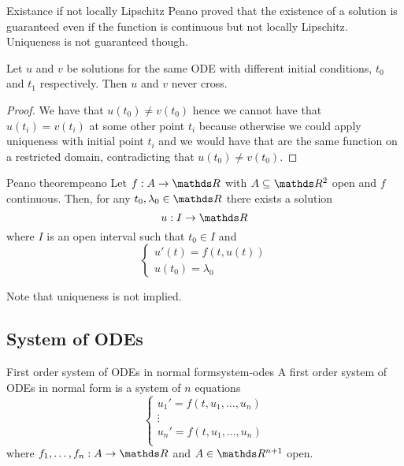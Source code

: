 \documentclass[12pt]{extarticle}
\begin{document}
\begin{remark}{Existance if not locally Lipschitz}{}
    Peano proved that the existence of a solution is guaranteed even if the function is continuous but not locally Lipschitz.
    Uniqueness is not guaranteed though.
\end{remark}

\begin{corollary}{}{}
    Let $u$ and $v$ be solutions for the same ODE with different initial conditions, $t_0$ and $t_1$ respectively.
    Then $u$ and $v$ never cross.
\end{corollary}

\begin{proof}
    We have that $u(t_0) \neq v(t_0)$ hence we cannot have that $u(t_i) = v(t_i)$ at some other point $t_i$ because otherwise we could apply uniqueness with initial point $t_i$ and we would have that are the same function on a restricted domain,
    contradicting that $u(t_0) \neq v(t_0)$.
\end{proof}

\begin{theorem}{Peano theorem}{peano}
    Let $f: A \to \R$ with $A \subseteq \R^2$ open and $f$ continuous.
    Then, for any $t_0, \lambda_0 \in \R$ there exists a solution
    \begin{equation}
        u: I \to \R
    \end{equation}
    where $I$ is an open interval such that $t_0 \in I$ and
    \begin{equation}
        \begin{cases}
            u'(t) = f(t, u(t)) \\
            u(t_0) = \lambda_0
        \end{cases}
    \end{equation}

    Note that uniqueness is not implied.
\end{theorem}

\subsection{System of ODEs}

\begin{definition}{First order system of ODEs in normal form}{system-odes}
    A first order system of ODEs in normal form is a system of $n$ equations
    \begin{equation}
        \begin{cases}
            u_1' = f(t, u_1, \dots, u_n) \\
            \vdots                       \\
            u_n' = f(t, u_1, \dots, u_n) \\
        \end{cases}
    \end{equation}
    where $f_1, \dots, f_n: A \to \R$ and $A \in \R^{n+1}$ open.
\end{definition}
\end{document}
